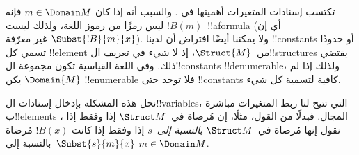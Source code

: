 \documentclass[../../../include/open-logic-section]{subfiles}
\begin{document}
\begin{explain}
تكتسب إسنادات المتغيرات أهميتها في
. والسبب أنه إذا كان $m \in \Domain M$
فإنه ليس رمزًا من رموز اللغة، ولذلك ليست $!B(m)$~!!a{formula} (أي إن
$\Subst{!B}{m}{x}$ غير معرّفة). ولا يمكننا أيضًا افتراض أن لدينا
!!{constant}s أو حدودًا تسمي كل !!{element} من~$\Struct{M}$، إذ لا
شيء في تعريف ال!!{structure}s يقتضي ذلك. وفي اللغة القياسية تكون
مجموعة ال!!{constant}s !!{denumerable}، ولذلك إذا لم يكن
$\Domain{M}$ !!{enumerable} فلا توجد حتى !!{constant}s كافية لتسمية
كل شيء.

نحل هذه المشكلة بإدخال إسنادات ال!!{variable}s، التي تتيح لنا ربط
المتغيرات مباشرة ب!!{element}s المجال. فبدلًا من القول، مثلًا، إن
 مُرضاة
في~$\Struct M$ إذا وفقط إذا
،
نقول إنها مُرضاة في~$\Struct M$ \emph{بالنسبة إلى}~$s$ إذا وفقط
إذا كانت $!B(x)$ مُرضاة بالنسبة إلى~$\Subst{s}{m}{x}$
 $m \in \Domain M$.
\end{explain}
\end{document}
